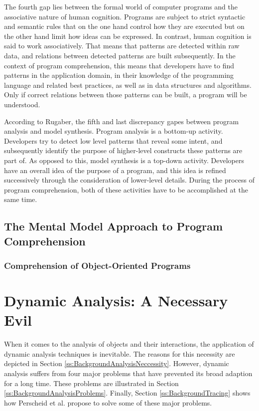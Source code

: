 The fourth gap lies between the formal world of computer programs and the associative nature of human cognition.
Programs are subject to strict syntactic and semantic rules that on the one hand control how they are executed but on the other hand limit how ideas can be expressed.
In contrast, human cognition is said to work associatively.
That means that patterns are detected within raw data, and relations between detected patterns are built subsequently.
In the context of program comprehension, this means that developers have to find patterns in the application domain, in their knowledge of the programming language and related best practices, as well as in data structures and algorithms.
Only if correct relations between those patterns can be built, a program will be understood.

According to Rugaber, the fifth and last discrepancy gapes between program analysis and model synthesis.
Program analysis is a bottom-up activity.
Developers try to detect low level patterns that reveal some intent, and subsequently identify the purpose of higher-level constructs these patterns are part of.
As opposed to this, model synthesis is a top-down activity.
Developers have an overall idea of the purpose of a program, and this idea is refined successively through the consideration of lower-level details.
During the process of program comprehension, both of these activities have to be accomplished at the same time.

\subsection{The Mental Model Approach to Program Comprehension}

\subsubsection{Comprehension of Object-Oriented Programs}

\section{Dynamic Analysis: A Necessary Evil}
\label{s:BackgroundAnalysis}
When it comes to the analysis of objects and their interactions, the application of dynamic analysis techniques is inevitable.
The reasons for this necessity are depicted in Section \ref{ss:BackgroundAnalysisNeccessity}.
However, dynamic analysis suffers from four major problems that have prevented its broad adaption for a long time.
These problems are illustrated in Section \ref{ss:BackgroundAnalysisProblems}.
Finally, Section \ref{ss:BackgroundTracing} shows how Perscheid et al. propose to solve some of these major problems.

